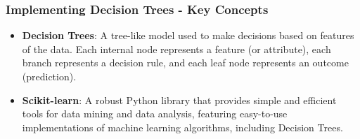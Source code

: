 \documentclass[aspectratio=169]{beamer}
\begin{document}
\begin{frame}[fragile]
    \frametitle{Implementing Decision Trees - Key Concepts}
    \begin{itemize}
        \item \textbf{Decision Trees}: A tree-like model used to make decisions based on features of the data. 
        Each internal node represents a feature (or attribute), each branch represents a decision rule, and each leaf node represents an outcome (prediction).
        
        \item \textbf{Scikit-learn}: A robust Python library that provides simple and efficient tools for data mining and data analysis,
        featuring easy-to-use implementations of machine learning algorithms, including Decision Trees.
    \end{itemize}
\end{frame}
\end{document}
